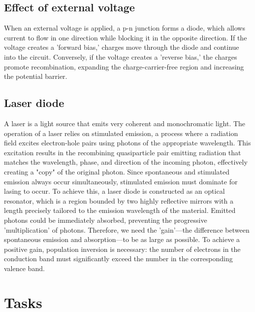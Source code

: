 \documentclass{article}
\begin{document}
\subsection{Effect of external voltage}
When an external voltage is applied, a p-n junction forms a diode, which allows current to flow in one direction while blocking it in the opposite direction. If the voltage creates a 'forward bias,' charges move through the diode and continue into the circuit. Conversely, if the voltage creates a 'reverse bias,' the charges promote recombination, expanding the charge-carrier-free region and increasing the potential barrier.

\subsection{Laser diode}
A laser is a light source that emits very coherent and monochromatic light. The operation of a laser relies on stimulated emission, a process where a radiation field excites electron-hole pairs using photons of the appropriate wavelength. This excitation results in the recombining quasiparticle pair emitting radiation that matches the wavelength, phase, and direction of the incoming photon, effectively creating a "copy" of the original photon. Since spontaneous and stimulated emission always occur simultaneously, stimulated emission must dominate for lasing to occur. To achieve this, a laser diode is constructed as an optical resonator, which is a region bounded by two highly reflective mirrors with a length precisely tailored to the emission wavelength of the material. Emitted photons could be immediately absorbed, preventing the progressive 'multiplication' of photons. Therefore, we need the 'gain'—the difference between spontaneous emission and absorption—to be as large as possible. To achieve a positive gain, population inversion is necessary: the number of electrons in the conduction band must significantly exceed the number in the corresponding valence band.





\section{Tasks}
\end{document}
